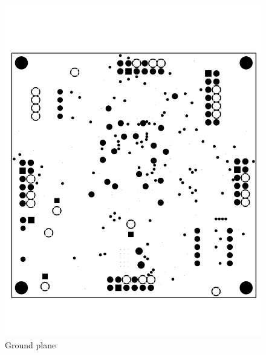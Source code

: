 \begin{appendices}
\begin{figure}[ptb]
	\begin{centering}
		\includegraphics[width=6in]{Appendices/Figures/appendices-layout_ground.pdf}
		\caption{Ground plane}
		\label{fig:appendices:layout_ground}
	\end{centering}
\end{figure}


\end{appendices}

